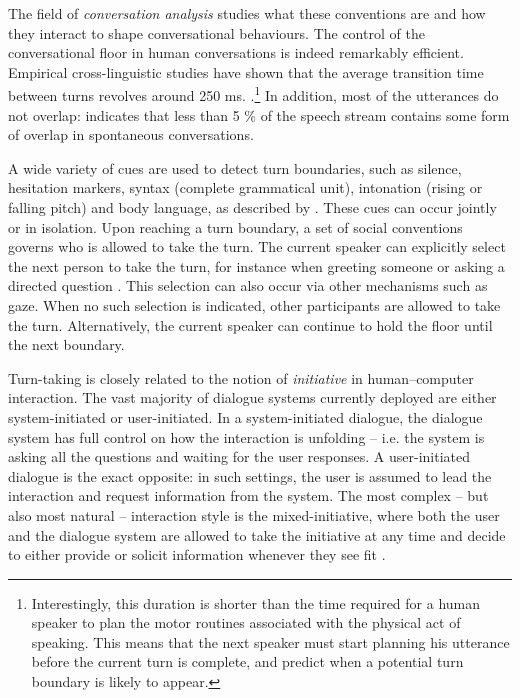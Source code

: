 The field of  \textit{conversation analysis} studies what these conventions are and how they interact to shape conversational behaviours. The control of the conversational floor in human conversations is indeed remarkably efficient.  Empirical cross-linguistic studies have shown that the average transition time between turns revolves around 250 ms. \citep{Stivers30062009}.\footnote{Interestingly, this duration is shorter than the time required for a human speaker to plan the motor routines associated with the physical act of speaking.  This means that the next speaker must start planning his utterance before the current turn is complete, and predict when a potential turn boundary is likely to appear.} In addition, most of the utterances do not overlap: \cite{Levinson1983} indicates that less than 5 \% of the speech stream contains some form of overlap in spontaneous conversations.  

A wide variety of cues are used to detect turn boundaries, such as silence, hesitation markers, syntax (complete grammatical unit), intonation (rising or falling pitch) and body language, as described by \cite{Duncan1972}.   These cues can occur jointly or in isolation. Upon reaching a turn boundary, a set of social conventions governs who is allowed to take the turn.  The current speaker can explicitly select the next person to take the turn, for instance when greeting someone or asking a directed question \citep{sacks1974}.   This selection can also occur via other mechanisms such as gaze.  When no such selection is indicated, other participants are allowed to take the turn.  Alternatively, the current speaker can continue to hold the floor until the next boundary. 

Turn-taking is closely related to the notion of \textit{initiative} in human--computer interaction. The vast majority of dialogue systems currently deployed are either system-initiated or user-initiated.  In a system-initiated dialogue, the dialogue system has full control on how the interaction is unfolding -- i.e. the system is asking all the questions and waiting for the user responses.  A user-initiated dialogue is the exact opposite: in such settings, the user is assumed to lead the interaction and request information from the system.  The most complex -- but also most natural -- interaction style is the mixed-initiative, where both the user and the dialogue system are allowed to take the initiative at any time and decide to either provide or solicit information whenever they see fit \citep{Horvitz:1999}. 

